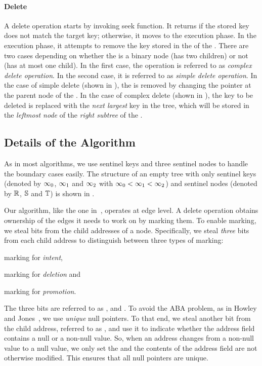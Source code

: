 \begin{limitscope}
\paragraph*{Delete} 


A delete operation starts by invoking seek function. It returns \false{} if the stored key does not match the target key; otherwise, it moves to the execution phase. In the execution phase, it attempts to remove the key stored in the \terminalnode{} of the \accesspath. There are two cases depending on whether the \terminalnode{} is a binary node (has two children) or not (has at most one child). In the first case, the operation is referred to as \emph{complex delete operation}. In the second case, it is referred to as \emph{simple delete operation}. In the case of simple delete (shown in ), the \terminalnode{} is removed by changing the pointer at the parent node of the \terminalnode. In the case of complex delete (shown in ), the key to be deleted is replaced with the \emph{next largest} key in the tree, which will be stored in the \emph{leftmost node} of the \emph{right subtree} of the \terminalnode.

\subsection{Details of the Algorithm}


As in most algorithms, we use sentinel keys and three sentinel nodes to handle the boundary cases easily.  The structure of an empty tree with only sentinel keys (denoted by $\infty_{0}$, $\infty_{1}$ and $\infty_{2}$ with $\infty_{0} < \infty_{1} < \infty_{2}$) and sentinel nodes (denoted by $\mathbb{R}$, $\mathbb{S}$ and $\mathbb{T}$) is shown in .


Our algorithm, like the one in~\cite{NatMit:2014:PPoPP}, operates at edge level. A delete operation obtains ownership of the edges it needs to work on by marking them. To enable marking, we steal bits from the child addresses of a node. Specifically, we steal \emph{three} bits from each child address to distinguish between three types of marking: 
\begin{enumerate*}[label=(\roman*)]
\item marking for \emph{intent}, 
\item marking for \emph{deletion} and 
\item marking for \emph{promotion}.
\end{enumerate*}
The three bits are referred to as \emph{\intentFlag}, \emph{\deleteFlag} and \emph{\promoteFlag}. To avoid the ABA problem, as in Howley and Jones~\cite{HowJon:2012:SPAA}, we use \emph{unique} null pointers. To that end, we steal another bit from the child address, referred to as \emph{\nullFlag}, and use it to indicate whether the address field contains a null or a non-null value. So, when an address changes from a non-null value to a null value, we only set the \nullFlag{} and the contents of the address field are not otherwise modified. This ensures that all null pointers are unique.


\end{limitscope}
